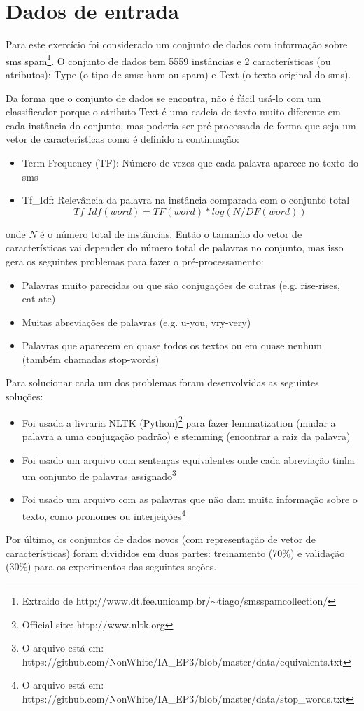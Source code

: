 \section{Dados de entrada}
\label{sec:dataset}

Para este exercício foi considerado um conjunto de dados com informação sobre sms spam\footnote{Extraido de http://www.dt.fee.unicamp.br/$\sim$tiago/smsspamcollection/}. O conjunto de dados tem 5559 instâncias e 2 características (ou atributos): Type (o tipo de sms: ham ou spam) e Text (o texto original do sms).

Da forma que o conjunto de dados se encontra, não é fácil usá-lo com um classificador porque o atributo Text é uma cadeia de texto muito diferente em cada instância do conjunto, mas poderia ser pré-processada de forma que seja um vetor de características como é definido a continuação:

\begin{itemize}
	\item Term Frequency (TF): Número de vezes que cada palavra aparece no texto do sms
	\item Tf\_Idf: Relevância da palavra na instância comparada com o conjunto total
		\[ {Tf\_Idf}( {word} ) = TF( {word} ) * log( N / DF( {word} ) ) \]
\end{itemize}
onde $N$ é o número total de instâncias. Então o tamanho do vetor de características vai depender do número total de palavras no conjunto, mas isso gera os seguintes problemas para fazer o pré-processamento:
\begin{itemize}
	\item Palavras muito parecidas ou que são conjugações de outras (e.g. rise-rises, eat-ate)
	\item Muitas abreviações de palavras (e.g. u-you, vry-very)
	\item Palavras que aparecem en quase todos os textos ou em quase nenhum (também chamadas stop-words)
\end{itemize}
Para solucionar cada um dos problemas foram desenvolvidas as seguintes soluções:
\begin{itemize}
	\item Foi usada a livraria NLTK (Python)\footnote{Official site: http://www.nltk.org} para fazer lemmatization (mudar a palavra a uma conjugação padrão) e stemming (encontrar a raiz da palavra)
	\item Foi usado um arquivo com sentenças equivalentes onde cada abreviação tinha um conjunto de palavras assignado\footnote{O arquivo está em: https://github.com/NonWhite/IA\_EP3/blob/master/data/equivalents.txt}
	\item Foi usado um arquivo com as palavras que não dam muita informação sobre o texto, como pronomes ou interjeições\footnote{O arquivo está em: https://github.com/NonWhite/IA\_EP3/blob/master/data/stop\_words.txt}
\end{itemize}

Por último, os conjuntos de dados novos (com representação de vetor de características) foram divididos em duas partes: treinamento (70\%) e validação (30\%) para os experimentos das seguintes seções.